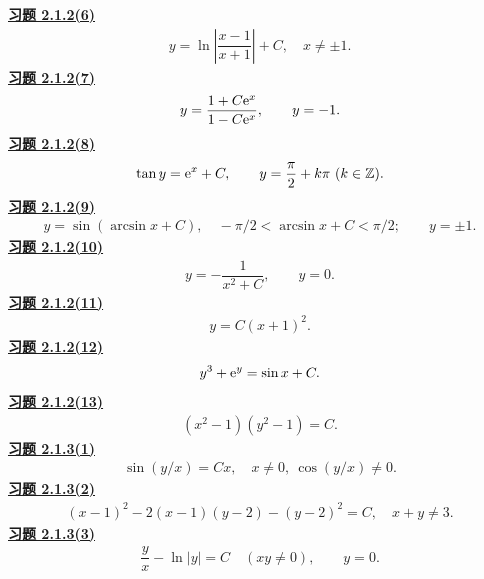 \noindent\textbf{\hyperref[q:2.1.2(6)]{习题 2.1.2(6)}}
\[\begin{gathered}y=\ln\left|\dfrac{x-1}{x+1}\right|+C,\quad x\ne\pm1.\end{gathered}\]
\noindent\textbf{\hyperref[q:2.1.2(7)]{习题 2.1.2(7)}}
\[\begin{gathered}y=\dfrac{1+C\mathrm e^x}{1-C\mathrm e^x},\qquad y=-1.\end{gathered}\]
\noindent\textbf{\hyperref[q:2.1.2(8)]{习题 2.1.2(8)}}
\[\begin{gathered}\tan y=\mathrm e^x+C,\qquad y=\dfrac\pi2+k\pi\ (k\in\mathbb Z).\end{gathered}\]
\noindent\textbf{\hyperref[q:2.1.2(9)]{习题 2.1.2(9)}}
\[\begin{gathered}y=\sin(\arcsin x+C),\quad -\pi/2<\arcsin x+C<\pi/2;\qquad y=\pm1.\end{gathered}\]
\noindent\textbf{\hyperref[q:2.1.2(10)]{习题 2.1.2(10)}}
\[\begin{gathered}y=-\dfrac1{x^2+C},\qquad y=0.\end{gathered}\]
\noindent\textbf{\hyperref[q:2.1.2(11)]{习题 2.1.2(11)}}
\[\begin{gathered}y=C(x+1)^2.\end{gathered}\]
\noindent\textbf{\hyperref[q:2.1.2(12)]{习题 2.1.2(12)}}
\[\begin{gathered}y^3+\mathrm e^y=\sin x+C.\end{gathered}\]
\noindent\textbf{\hyperref[q:2.1.2(13)]{习题 2.1.2(13)}}
\[\begin{gathered}(x^2-1)(y^2-1)=C.\end{gathered}\]
\noindent\textbf{\hyperref[q:2.1.3(1)]{习题 2.1.3(1)}}
\[\begin{gathered}\sin(y/x)=Cx,\quad x\ne0,\ \cos(y/x)\ne0.\end{gathered}\]
\noindent\textbf{\hyperref[q:2.1.3(2)]{习题 2.1.3(2)}}
\[\begin{gathered}(x-1)^2-2(x-1)(y-2)-(y-2)^2=C,\quad x+y\ne3.\end{gathered}\]
\noindent\textbf{\hyperref[q:2.1.3(3)]{习题 2.1.3(3)}}
\[\begin{gathered}\dfrac yx-\ln|y|=C\quad(xy\ne0),\qquad y=0.\end{gathered}\]
